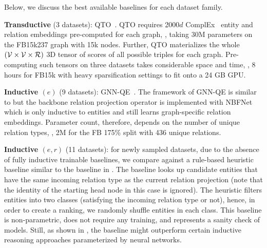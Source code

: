 Below, we discuss the best available baselines for each dataset family.

\textbf{Transductive} (3 datasets): QTO~\citep{qto}. QTO requires  2000$d$ ComplEx~\citep{complex} entity and relation embeddings pre-computed for each graph, \eg, taking 30M parameters on the FB15k237 graph with 15k nodes. 
Further, QTO materializes the whole $({\mathcal{V}} \times {\mathcal{V}} \times {\mathcal{R}})$ 3D tensor of scores of all possible triples for each graph. 
Pre-computing such tensors on three datasets takes considerable space and time, \eg, 8 hours for FB15k with heavy sparsification settings to fit onto a 24 GB GPU.

\textbf{Inductive $(e)$} (9 datasets): GNN-QE~\citep{gnn_qe}. The framework of GNN-QE is similar to \method but the backbone relation projection operator is implemented with NBFNet~\citep{nbfnet} which is only inductive to entities and still learns graph-specific relation embeddings. 
Parameter count, therefore, depends on the number of unique relation types, \eg, 2M for the FB 175\% split with 436 unique relations.

\textbf{Inductive $(e,r)$} (11 datasets): for newly sampled datasets, due to the absence of fully inductive trainable baselines, we compare against a rule-based heuristic baseline similar to the baseline in \citet{galkin2022}.
The baseline looks up candidate entities that have the same incoming relation type as the current relation projection (note that the identity of the starting head node in this case is ignored). 
The heuristic filters entities into two classes (satisfying the incoming relation type or not), hence, in order to create a ranking, we randomly shuffle entities in each class.
This baseline is non-parametric, does not require any training, and represents a sanity check of \clqa models. Still, as shown in \citet{galkin2022}, the baseline might outperform certain inductive reasoning approaches parameterized by neural networks. 


